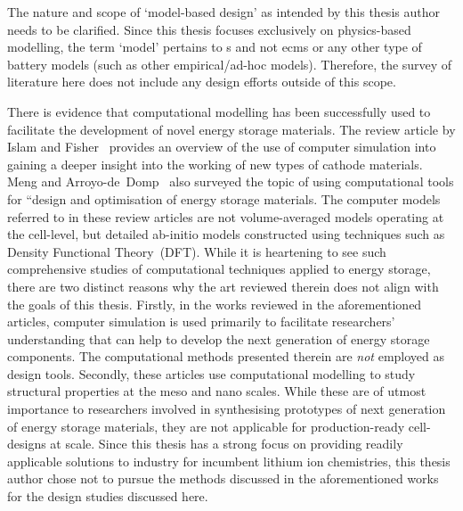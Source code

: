 The nature and  scope of `model-based design' as intended  by this thesis author
needs to  be clarified. Since  this thesis focuses exclusively  on physics-based
modelling, the term  `model' pertains to s and  not \glspl{ecm} or
any  other type  of  battery  models (such  as  other empirical/ad-hoc  models).
Therefore, the  survey of literature  here does  not include any  design efforts
outside of this scope.

There is  evidence that  computational modelling has  been successfully  used to
facilitate the development of novel energy storage materials. The review article
by Islam and Fisher~\cite{Islam2014} provides an overview of the use of computer
simulation  into gaining  a deeper  insight  into the  working of  new types  of
cathode  materials. Meng  and Arroyo-de~Domp~\cite{Meng2009}  also surveyed  the
topic  of using  computational tools  for  ``design and  optimisation of  energy
storage materials. The computer models referred  to in these review articles are
not volume-averaged models  operating at the cell-level,  but detailed ab-initio
models  constructed using  techniques such  as Density  Functional Theory~(DFT).
While  it is  heartening  to  see such  comprehensive  studies of  computational
techniques applied to energy storage, there are two distinct reasons why the art
reviewed therein does not  align with the goals of this  thesis. Firstly, in the
works  reviewed in  the  aforementioned articles,  computer  simulation is  used
primarily  to facilitate  researchers' understanding  that can  help to  develop
the  next generation  of energy  storage components.  The computational  methods
presented  therein are  \emph{not}  employed as  design  tools. Secondly,  these
articles use computational modelling to  study structural properties at the meso
and nano scales. While these are of utmost importance to researchers involved in
synthesising prototypes of next generation of energy storage materials, they are
not applicable for production-ready cell-designs at scale. Since this thesis has
a  strong  focus on  providing  readily  applicable  solutions to  industry  for
incumbent lithium  ion chemistries, this thesis  author chose not to  pursue the
methods discussed in  the aforementioned works for the  design studies discussed
here.

